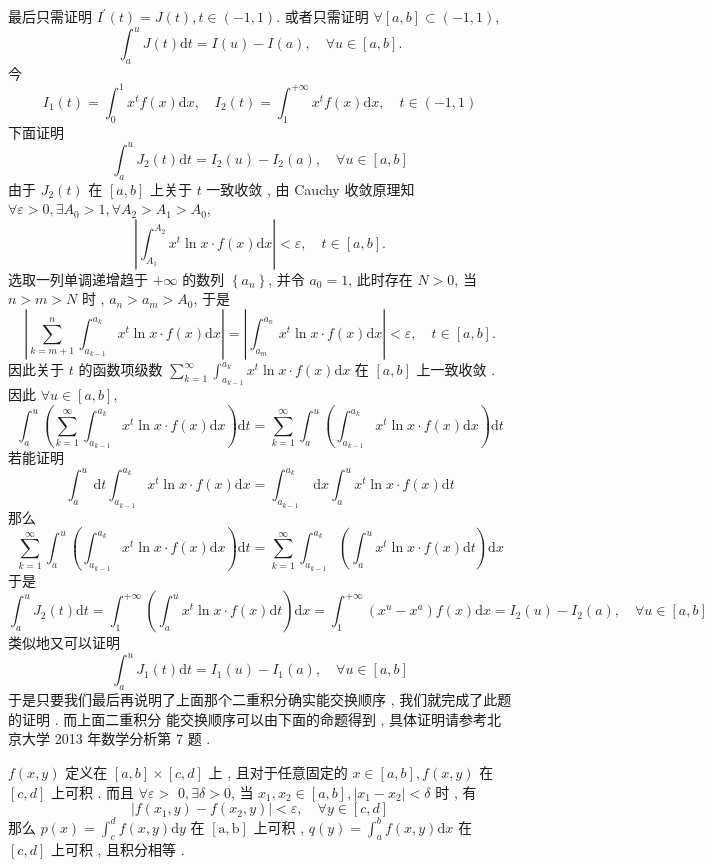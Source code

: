 \documentclass[10pt]{article}
\begin{document}
 最后只需证明  $I^{\prime}(t)=J(t), t \in(-1,1)$.  或者只需证明  $\forall[a, b] \subset(-1,1)$,
$$
\int_{a}^{u} J(t) \mathrm{d} t=I(u)-I(a), \quad \forall u \in[a, b] .
$$
 今 
$$
I_{1}(t)=\int_{0}^{1} x^{t} f(x) \mathrm{d} x, \quad I_{2}(t)=\int_{1}^{+\infty} x^{t} f(x) \mathrm{d} x, \quad t \in(-1,1)
$$
 下面证明 
$$
\int_{a}^{u} J_{2}(t) \mathrm{d} t=I_{2}(u)-I_{2}(a), \quad \forall u \in[a, b]
$$
 由于  $J_{2}(t)$  在  $[a, b]$  上关于  $t$  一致收敛 ,  由  Cauchy  收敛原理知  $\forall \varepsilon>0, \exists A_{0}>1, \forall A_{2}>A_{1}>A_{0}$,
$$
\left|\int_{A_{1}}^{A_{2}} x^{t} \ln x \cdot f(x) \mathrm{d} x\right|<\varepsilon, \quad t \in[a, b] .
$$
 选取一列单调递增趋于  $+\infty$  的数列  $\left\{a_{n}\right\}$,  并令  $a_{0}=1$,  此时存在  $N>0$,  当  $n>m>N$  时 , $a_{n}>a_{m}>A_{0}$,  于是 
$$
\left|\sum_{k=m+1}^{n} \int_{a_{k-1}}^{a_{k}} x^{t} \ln x \cdot f(x) \mathrm{d} x\right|=\left|\int_{a_{m}}^{a_{n}} x^{t} \ln x \cdot f(x) \mathrm{d} x\right|<\varepsilon, \quad t \in[a, b] .
$$
 因此关于  $t$  的函数项级数  $\sum_{k=1}^{\infty} \int_{a_{k-1}}^{a_{k}} x^{t} \ln x \cdot f(x) \mathrm{d} x$  在  $[a, b]$  上一致收敛 .  因此  $\forall u \in[a, b]$,
$$
\int_{a}^{u}\left(\sum_{k=1}^{\infty} \int_{a_{k-1}}^{a_{k}} x^{t} \ln x \cdot f(x) \mathrm{d} x\right) \mathrm{d} t=\sum_{k=1}^{\infty} \int_{a}^{u}\left(\int_{a_{k-1}}^{a_{k}} x^{t} \ln x \cdot f(x) \mathrm{d} x\right) \mathrm{d} t
$$
 若能证明 
$$
\int_{a}^{u} \mathrm{~d} t \int_{a_{k-1}}^{a_{k}} x^{t} \ln x \cdot f(x) \mathrm{d} x=\int_{a_{k-1}}^{a_{k}} \mathrm{~d} x \int_{a}^{u} x^{t} \ln x \cdot f(x) \mathrm{d} t
$$
 那么 
$$
\sum_{k=1}^{\infty} \int_{a}^{u}\left(\int_{a_{k-1}}^{a_{k}} x^{t} \ln x \cdot f(x) \mathrm{d} x\right) \mathrm{d} t=\sum_{k=1}^{\infty} \int_{a_{k-1}}^{a_{k}}\left(\int_{a}^{u} x^{t} \ln x \cdot f(x) \mathrm{d} t\right) \mathrm{d} x
$$
 于是 
$$
\int_{a}^{u} J_{2}(t) \mathrm{d} t=\int_{1}^{+\infty}\left(\int_{a}^{u} x^{t} \ln x \cdot f(x) \mathrm{d} t\right) \mathrm{d} x=\int_{1}^{+\infty}\left(x^{u}-x^{a}\right) f(x) \mathrm{d} x=I_{2}(u)-I_{2}(a), \quad \forall u \in[a, b]
$$
 类似地又可以证明 
$$
\int_{a}^{u} J_{1}(t) \mathrm{d} t=I_{1}(u)-I_{1}(a), \quad \forall u \in[a, b]
$$
 于是只要我们最后再说明了上面那个二重积分确实能交换顺序 ,  我们就完成了此题的证明 .  而上面二重积分   能交换顺序可以由下面的命题得到 ,  具体证明请参考北京大学  2013  年数学分析第  7  题 .

$f(x, y)$  定义在  $[a, b] \times[c, d]$  上 ,  且对于任意固定的  $x \in[a, b], f(x, y)$  在  $[c, d]$  上可积 .  而且  $\forall \varepsilon>$ $0, \exists \delta>0$,  当  $x_{1}, x_{2} \in[a, b],\left|x_{1}-x_{2}\right|<\delta$  时 ,  有 
$$
\left|f\left(x_{1}, y\right)-f\left(x_{2}, y\right)\right|<\varepsilon, \quad \forall y \in[c, d]
$$
 那么  $p(x)=\int_{c}^{d} f(x, y) \mathrm{d} y$  在  $[\mathrm{a}, \mathrm{b}]$  上可积 , $q(y)=\int_{a}^{b} f(x, y) \mathrm{d} x$  在  $[c, d]$  上可积 ,  且积分相等 .
\end{document}
